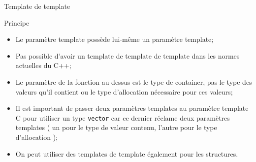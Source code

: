 \documentclass[handout,10pt]{beamer}
\newcommand{\includepartcode}[4][cpp]{

}
\begin{document}
\begin{frame}[fragile]{Template de template}
\tiny
\begin{exampleblock}{Principe}
\begin{itemize}
\item Le paramètre template possède lui-même un paramètre template;
\item Pas possible d'avoir un template de template de template dans les normes actuelles du C++;
\end{itemize}
\includepartcode{template_of_template.cpp}{11}{19}
\begin{itemize}
\item Le paramètre de la fonction au dessus est le type de container, pas le type des valeurs qu'il contient ou le type d'allocation nécessaire pour ces valeurs;
\item Il est important de passer deux paramètres templates au paramètre template C pour utiliser un type \lstinline$vector$ car
ce dernier réclame deux paramètres templates ( un pour le type de valeur contenu, l'autre pour le type d'allocation );
\item On peut utiliser des templates de template également pour les structures.
\end{itemize}
\end{exampleblock}
\end{frame}
\end{document}
